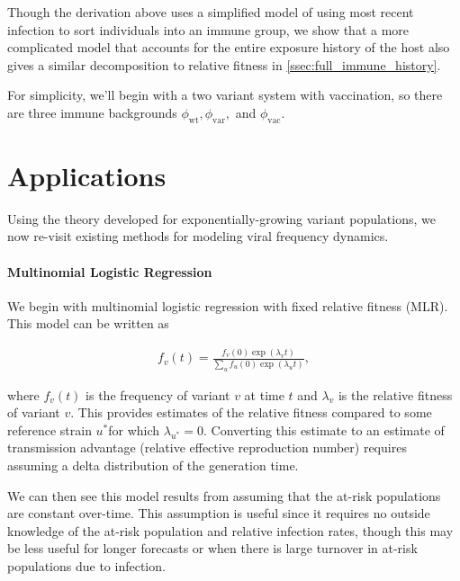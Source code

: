 \documentclass[12pt,oneside,letterpaper]{article}
\newcommand{\wt}{\text{wt}}
\newcommand{\var}{\text{var}}
\newcommand{\vac}{\text{vac}}
\begin{document}
Though the derivation above uses a simplified model of using most recent infection to sort individuals into an immune group, we show that a more complicated model that accounts for the entire exposure history of the host also gives a similar decomposition to relative fitness in \ref{ssec:full_immune_history}.




For simplicity, we'll begin with a two variant system with vaccination, so there are three immune backgrounds $\phi_{\wt}, \phi_{\var},$ and $\phi_{\vac}$.


\section*{Applications}

Using the theory developed for exponentially-growing variant populations, we now re-visit existing methods for modeling viral frequency dynamics.

\paragraph{Multinomial Logistic Regression}%

We begin with multinomial logistic regression with fixed relative fitness (MLR).
This model can be written as

\begin{align*}
    f_{v}(t) = \frac{f_{v}(0) \exp(\lambda_{v} t)}{\sum_{u} f_{u}(0) \exp(\lambda_{u} t)},
\end{align*}

where $f_{v}(t)$ is the frequency of variant $v$ at time $t$ and $\lambda_{v}$ is the relative fitness of variant $v$.
This provides estimates of the relative fitness compared to some reference strain $u^{*}$for which $\lambda_{u^*} = 0$.
Converting this estimate to an estimate of transmission advantage (relative effective reproduction number) requires assuming a delta distribution of the generation time. \cite{Wallinga2006}

We can then see this model results from assuming that the at-risk populations are constant over-time.
This assumption is useful since it requires no outside knowledge of the at-risk population and relative infection rates, though this may be less useful for longer forecasts or when there is large turnover in at-risk populations due to infection.
\end{document}

